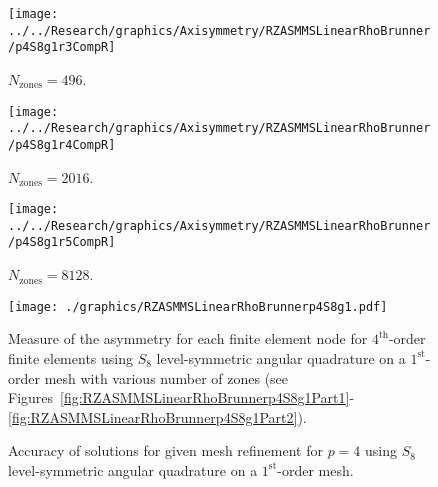 \documentclass[12pt,letterpaper]{article}
\begin{document}
\begin{sidewaysfigure}[!htb]
\centering
\begin{subfigure}{0.33\textwidth}
\texttt{[image: ../../Research/graphics/Axisymmetry/RZASMMSLinearRhoBrunner/p4S8g1r3CompR]}
\caption{$N_\text{zones}=496$.}
\end{subfigure}%
\begin{subfigure}{0.33\textwidth}
\texttt{[image: ../../Research/graphics/Axisymmetry/RZASMMSLinearRhoBrunner/p4S8g1r4CompR]}
\caption{$N_\text{zones}=2016$.}
\end{subfigure}%
\begin{subfigure}{0.33\textwidth}
\texttt{[image: ../../Research/graphics/Axisymmetry/RZASMMSLinearRhoBrunner/p4S8g1r5CompR]}
\caption{$N_\text{zones}=8128$.}
\end{subfigure}
\caption{Relative asymmetry for $p=4$ finite elements on a $1^\text{st}$-order mesh for $S_8$ level-symmetric angular quadrature for $N_\text{zones}=\{496,2016,8128\}$; mesh overlay may be removed for clarity.}
\label{fig:RZASMMSLinearRhoBrunnerp4S8g1Part2}
\end{sidewaysfigure}

\begin{figure}[!htb]
\centering
\texttt{[image: ./graphics/RZASMMSLinearRhoBrunnerp4S8g1.pdf]}
\caption{Measure of the asymmetry for each finite element node for $4^\text{th}$-order finite elements using $S_8$ level-symmetric angular quadrature on a $1^\text{st}$-order mesh with various number of zones (see Figures~\ref{fig:RZASMMSLinearRhoBrunnerp4S8g1Part1}-\ref{fig:RZASMMSLinearRhoBrunnerp4S8g1Part2}).}
\label{fig:RZASMMSLinearRhoBrunnerp4S8g1Nodes}
\end{figure}

\begin{figure}[!htb]
\centering
{}
\caption{Accuracy of solutions for given mesh refinement for $p=4$ using $S_8$ level-symmetric angular quadrature on a $1^\text{st}$-order mesh.}
\label{fig:RZASMMSLinearRhoBrunnerp4S8g1Accuracy}
\end{figure}
\end{document}

